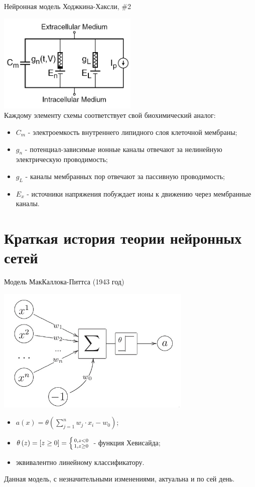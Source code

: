 \documentclass[10pt]{beamer}
\begin{document}
\begin{frame}{Нейронная модель Ходжкина-Хаксли, \#2}

\centering
\includegraphics[width=0.5\textwidth]{images/Hodgkin-Huxley.jpg}\\
Каждому элементу схемы соответствует свой биохимический аналог:
\begin{itemize}
	\item $C_m$ - электроемкость внутреннего липидного слоя клеточной мембраны;
	\item $g_n$ - потенциал-зависимые ионные каналы отвечают за нелинейную электрическую проводимость;
	\item $g_L$ - каналы мембранных пор отвечают за пассивную проводимость;
	\item $E_x$ - источники напряжения побуждает ионы к движению через мембранные каналы.
\end{itemize}


\end{frame}


\section{Краткая история теории нейронных сетей}

\begin{frame}{Модель МакКаллока-Питтса (1943 год)}

\centering
\includegraphics[width=0.7\textwidth]{images/neuron_m_p.jpg}
\begin{itemize}
	\item $a\left(x\right) = \theta\left(\sum_{j = 1}^{n}w_j \cdot x_i - w_0\right)$;
	\item $\theta\left(z\right) = \left[z \geq 0 \right] = \left\{ {0, z < 0\atop1, z \geq 0} \right.$ - функция Хевисайда;
	\item эквивалентно линейному классификатору.
\end{itemize}
\begin{flushleft}
Данная модель, с незначительными изменениями, актуальна и по сей день.
\end{flushleft}

\end{frame}
\end{document}
